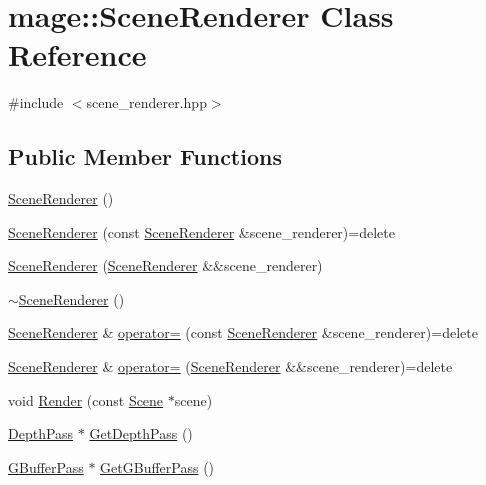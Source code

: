 \hypertarget{classmage_1_1_scene_renderer}{}\section{mage\+:\+:Scene\+Renderer Class Reference}
\label{classmage_1_1_scene_renderer}


{\ttfamily \#include $<$scene\+\_\+renderer.\+hpp$>$}

\subsection*{Public Member Functions}
\begin{DoxyCompactItemize}
\item 
\hyperlink{classmage_1_1_scene_renderer_a5d91f3c9b4e6e7c16d77a6791fadbd64}{Scene\+Renderer} ()
\item 
\hyperlink{classmage_1_1_scene_renderer_a9ea97945a7675ef805f00fb437a3d1aa}{Scene\+Renderer} (const \hyperlink{classmage_1_1_scene_renderer}{Scene\+Renderer} \&scene\+\_\+renderer)=delete
\item 
\hyperlink{classmage_1_1_scene_renderer_ab9846f0a77e2bc5e9eeb00aed67424eb}{Scene\+Renderer} (\hyperlink{classmage_1_1_scene_renderer}{Scene\+Renderer} \&\&scene\+\_\+renderer)
\item 
\hyperlink{classmage_1_1_scene_renderer_a546f45fc7542fa1677d3e9c2014f108e}{$\sim$\+Scene\+Renderer} ()
\item 
\hyperlink{classmage_1_1_scene_renderer}{Scene\+Renderer} \& \hyperlink{classmage_1_1_scene_renderer_a5b63908f5bdfe6128b43847db01db983}{operator=} (const \hyperlink{classmage_1_1_scene_renderer}{Scene\+Renderer} \&scene\+\_\+renderer)=delete
\item 
\hyperlink{classmage_1_1_scene_renderer}{Scene\+Renderer} \& \hyperlink{classmage_1_1_scene_renderer_af64b01e57b0367a285f48e1f34f291e3}{operator=} (\hyperlink{classmage_1_1_scene_renderer}{Scene\+Renderer} \&\&scene\+\_\+renderer)=delete
\item 
void \hyperlink{classmage_1_1_scene_renderer_aa7825b36b1c9e0d22cbd49a9df5e73e4}{Render} (const \hyperlink{classmage_1_1_scene}{Scene} $\ast$scene)
\item 
\hyperlink{classmage_1_1_depth_pass}{Depth\+Pass} $\ast$ \hyperlink{classmage_1_1_scene_renderer_ab244160e40057cfbd5a05234621466bd}{Get\+Depth\+Pass} ()
\item 
\hyperlink{classmage_1_1_g_buffer_pass}{G\+Buffer\+Pass} $\ast$ \hyperlink{classmage_1_1_scene_renderer_a5a862266e0e39235d60c905259eccb51}{Get\+G\+Buffer\+Pass} ()

\end{DoxyCompactItemize}
